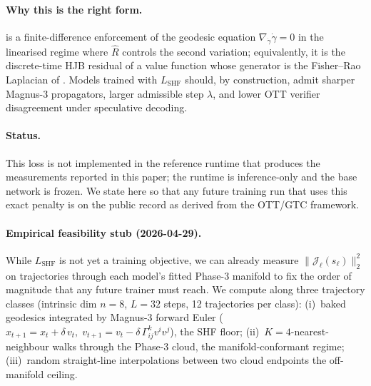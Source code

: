 \documentclass[11pt]{article}
\begin{document}
\paragraph{Why this is the right form.}
 is a finite-difference enforcement of the geodesic
equation $\nabla_{\dot\gamma}\dot\gamma=0$ in the linearised regime where
$\hat R$ controls the second variation; equivalently, it is the
discrete-time HJB residual of a value function whose generator is the
Fisher--Rao Laplacian of .  Models trained
with $L_{\mathrm{SHF}}$ should, by construction, admit
sharper Magnus-3 propagators, larger admissible step $\lambda$, and
lower OTT verifier disagreement under speculative decoding.

\paragraph{Status.}
This loss is not implemented in the reference runtime that
produces the measurements reported in this paper; the runtime is
inference-only and the base network is frozen.  We state
 here so that any future training run that uses this
exact penalty is on the public record as derived from the OTT/GTC
framework.

\paragraph{Empirical feasibility stub (2026-04-29).}
While $L_\text{SHF}$ is not yet a training objective, we can already
measure $\bigl\|\mathcal{J}_\ell(s_\ell)\bigr\|_2^2$ on trajectories
through each model's fitted Phase-3 manifold to fix the order of
magnitude that any future trainer must reach. We compute
 along three trajectory classes (intrinsic
dim $n{=}8$, $L{=}32$ steps, 12 trajectories per class):
(i)~baked geodesics integrated by Magnus-3 forward Euler
($x_{t+1}{=}x_t{+}\delta\,v_t,\;
v_{t+1}{=}v_t{-}\delta\,\Gamma^k_{ij}v^iv^j$), the SHF
floor;
(ii)~$K{=}4$-nearest-neighbour walks through the Phase-3 cloud, the
manifold-conformant regime;
(iii)~random straight-line interpolations between two cloud endpoints
the off-manifold ceiling.
\end{document}
